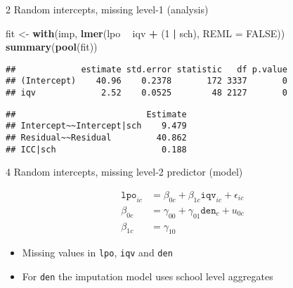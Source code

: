 \documentclass[ignorenonframetext,aspectratio=43]{beamer}
\newenvironment{Shaded}{\begin{snugshade}}{\end{snugshade}}
\newcommand{\KeywordTok}[1]{\textcolor[rgb]{0.13,0.29,0.53}{\textbf{#1}}}
\newcommand{\DataTypeTok}[1]{\textcolor[rgb]{0.13,0.29,0.53}{#1}}
\newcommand{\DecValTok}[1]{\textcolor[rgb]{0.00,0.00,0.81}{#1}}
\newcommand{\StringTok}[1]{\textcolor[rgb]{0.31,0.60,0.02}{#1}}
\newcommand{\OtherTok}[1]{\textcolor[rgb]{0.56,0.35,0.01}{#1}}
\newcommand{\OperatorTok}[1]{\textcolor[rgb]{0.81,0.36,0.00}{\textbf{#1}}}
\newcommand{\NormalTok}[1]{#1}
\providecommand{\tightlist}{%
  \setlength{\itemsep}{0pt}\setlength{\parskip}{0pt}}
\begin{document}
\begin{frame}[fragile]{2 Random intercepts, missing level-1 (analysis)}

\begin{Shaded}
\begin{Highlighting}[]
\NormalTok{fit <-}\StringTok{ }\KeywordTok{with}\NormalTok{(imp, }\KeywordTok{lmer}\NormalTok{(lpo }\OperatorTok{~}\StringTok{  }\NormalTok{iqv }\OperatorTok{+}\StringTok{ }\NormalTok{(}\DecValTok{1} \OperatorTok{|}\StringTok{ }\NormalTok{sch), }\DataTypeTok{REML =} \OtherTok{FALSE}\NormalTok{))}
\KeywordTok{summary}\NormalTok{(}\KeywordTok{pool}\NormalTok{(fit))}
\end{Highlighting}
\end{Shaded}

\begin{verbatim}
##             estimate std.error statistic   df p.value
## (Intercept)    40.96    0.2378       172 3337       0
## iqv             2.52    0.0525        48 2127       0
\end{verbatim}

\begin{Shaded}
\end{Shaded}

\begin{verbatim}
##                          Estimate
## Intercept~~Intercept|sch    9.479
## Residual~~Residual         40.862
## ICC|sch                     0.188
\end{verbatim}

\end{frame}

\begin{frame}[fragile]{4 Random intercepts, missing level-2 predictor
(model)}

\begin{align}
{{\texttt{lpo}}}_{ic} & = \beta_{0c} + \beta_{1c}{{\texttt{iqv}}}_{ic} + \epsilon_{ic}\\
\beta_{0c}     & = \gamma_{00} + \gamma_{01}{{\texttt{den}}}_{c} + u_{0c}\\
\beta_{1c}     & = \gamma_{10}
\end{align}

\begin{itemize}
\tightlist
\item
  Missing values in \texttt{lpo}, \texttt{iqv} and \texttt{den}
\item
  For \texttt{den} the imputation model uses school level aggregates
\end{itemize}

\end{frame}
\end{document}
